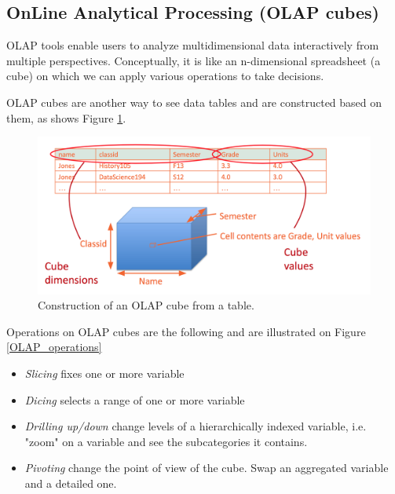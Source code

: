 \subsection{OnLine Analytical Processing (OLAP cubes)}

OLAP tools enable users to analyze multidimensional data interactively from multiple perspectives. Conceptually, it is like an n-dimensional spreadsheet (a cube) on which we can apply various operations to take decisions.

OLAP cubes are another way to see data tables and are constructed based on them, as shows Figure \ref{OLAP_cubes}.

\begin{figure}[H]%
 \centering
 \includegraphics[width=12cm]{./img/02/OLAP_cube}
 \caption{\label{OLAP_cubes} Construction of an OLAP cube from a table.}
\end{figure}

Operations on OLAP cubes are the following and are illustrated on Figure \ref{OLAP_operations}
\begin{itemize}
	\item \emph{Slicing} fixes one or more variable
	\item \emph{Dicing} selects a range of one or more variable
	\item \emph{Drilling up/down} change levels of a hierarchically indexed variable, i.e. "zoom" on a variable and see the subcategories it contains.
	\item \emph{Pivoting} change the point of view of the cube. Swap an aggregated variable and a detailed one.
\end{itemize}

